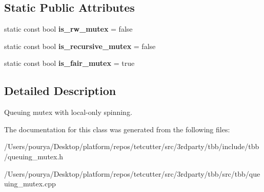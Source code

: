 \subsection*{Static Public Attributes}
\begin{DoxyCompactItemize}
\item 
\hypertarget{classtbb_1_1queuing__mutex_a504f3af8a939468f1514604c0941bc62}{}static const bool {\bfseries is\+\_\+rw\+\_\+mutex} = false\label{classtbb_1_1queuing__mutex_a504f3af8a939468f1514604c0941bc62}

\item 
\hypertarget{classtbb_1_1queuing__mutex_a47ad4cdac79581c01a66241e2e5c2c07}{}static const bool {\bfseries is\+\_\+recursive\+\_\+mutex} = false\label{classtbb_1_1queuing__mutex_a47ad4cdac79581c01a66241e2e5c2c07}

\item 
\hypertarget{classtbb_1_1queuing__mutex_a5b4833b97208bd699cba061dfc3057cc}{}static const bool {\bfseries is\+\_\+fair\+\_\+mutex} = true\label{classtbb_1_1queuing__mutex_a5b4833b97208bd699cba061dfc3057cc}

\end{DoxyCompactItemize}


\subsection{Detailed Description}
Queuing mutex with local-\/only spinning. 



The documentation for this class was generated from the following files\+:\begin{DoxyCompactItemize}
\item 
/\+Users/pourya/\+Desktop/platform/repos/tetcutter/src/3rdparty/tbb/include/tbb/queuing\+\_\+mutex.\+h\item 
/\+Users/pourya/\+Desktop/platform/repos/tetcutter/src/3rdparty/tbb/src/tbb/queuing\+\_\+mutex.\+cpp\end{DoxyCompactItemize}
